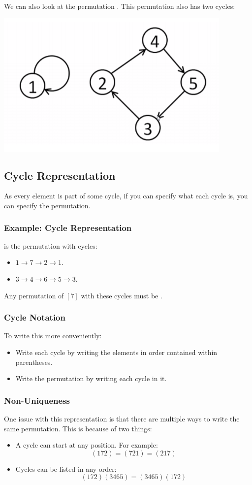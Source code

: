 \documentclass[letterpaper]{article}
\begin{document}
We can also look at the permutation . This permutation also has two cycles:
\begin{center}
    \includegraphics[scale=0.5]{ex_cycle_2.PNG}
\end{center}

\subsection{Cycle Representation}
As every element is part of some cycle, if you can specify what each cycle is, you can specify the permutation. 

\subsubsection{Example: Cycle Representation}
 is the permutation with cycles:
\begin{itemize}
    \item $1 \to 7 \to 2 \to 1$.
    \item $3 \to 4 \to 6 \to 5 \to 3$.
\end{itemize}
Any permutation of $[7]$ with these cycles must be .

\subsubsection{Cycle Notation}
To write this more conveniently:
\begin{itemize}
    \item Write each cycle by writing the elements in order contained within parentheses.
    \item Write the permutation by writing each cycle in it. 
\end{itemize}

\subsubsection{Non-Uniqueness}
One issue with this representation is that there are multiple ways to write the same permutation. This is because of two things:
\begin{itemize}
    \item A cycle can start at any position. For example:
    \[(172) = (721) = (217)\]
    
    \item Cycles can be listed in any order:
    \[(172)(3465) = (3465)(172)\]
\end{itemize}
\end{document}
